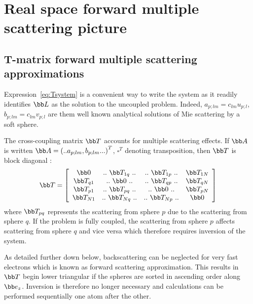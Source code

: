 \section{Real space forward multiple scattering picture}

\subsection{T-matrix forward multiple scattering approximations}
Expression~\eqref{eq:Tsystem} is a convenient way to write the system as it
readily identifies $\bb L$ as the solution to the uncoupled problem.
Indeed,
$a_{p;lm}=c_{lm}u_{p;l}$,
$b_{p;lm}=c_{lm}v_{p;l}$
are them well known analytical solutions of Mie scattering by a soft sphere.

The cross-coupling matrix $\bb T$ accounts for multiple scattering effects.
If $\bb A$ is written $\bb A=\left(..a_{p;lm},b_{p;lm}...\right)^T$,
$\square^T$ denoting transposition, then $\bb T$ is block diagonal :
%
\begin{equation*}
  \bb T =\left[
    \begin{array}{cccc}
      \bb 0      & ..~\bb T_{1q}~.. & ..~\bb T_{1p}~.. & \bb T_{1N}\\
      \bb T_{q1} & ..~\bb 0     ~.. & ..~\bb T_{qp}~.. & \bb T_{qN}\\
      \bb T_{p1} & ..~\bb T_{pq}~.. & ..~\bb 0     ~.. & \bb T_{pN}\\
      \bb T_{N1} & ..~\bb T_{Nq}~.. & ..~\bb T_{Np}~.. & \bb 0     \\
    \end{array}\right]
\end{equation*}
%
where $\bb T_{pq}$ represents the scattering from sphere $p$ due to the
scattering from sphere $q$. If the problem is fully coupled, the scattering
from sphere $p$ affects scattering from sphere $q$ and vice versa which
therefore requires inversion of the system.

As detailed further down below, backscattering can be neglected for very
fast electrons which is known as forward scattering approximation. This results
in $\bb T$ begin lower triangular if the spheres are sorted in ascending
order along $\bb e_z$. Inversion is therefore no longer necessary and
calculations can be performed sequentially one atom after the other.

